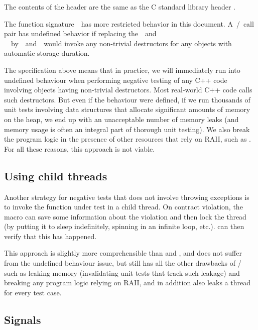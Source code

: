 \begin{adjustwidth}{0.5cm}{0.5cm}
The contents of the header  are the same as the C standard library header .

The function signature  has more restricted behavior in this document. A / call pair has undefined behavior if replacing the  and \\  by  and  would invoke any non-trivial destructors for any objects with automatic storage duration.
\end{adjustwidth}

The specification above means that in practice, we will immediately run into undefined behaviour when performing negative testing of any C++ code involving objects having non-trivial destructors. Most real-world C++ code calls such destructors. But even if the behaviour were defined, if we run thousands of unit tests involving data structures that allocate significant amounts of memory on the heap, we end up with an unacceptable number of memory leaks (and memory usage is often an integral part of thorough unit testing). We also break the program logic in the presence of other resources that rely on RAII, such as . For all these reasons, this approach is not viable.

\subsection{Using child threads}

Another strategy for negative tests that does not involve throwing exceptions is to invoke the function under test in a child thread. On contract violation, the  macro can save some information about the violation and then lock the thread (by putting it to sleep indefinitely, spinning in an infinite loop, etc.).  can then verify that this has happened.

This approach is slightly more comprehensible than  and , and does not suffer from the undefined behaviour issue, but still has all the other drawbacks of / such as leaking memory (invalidating unit tests that track such leakage) and breaking any program logic relying on RAII, and in addition also leaks a thread for every test case.


\subsection{Signals}


